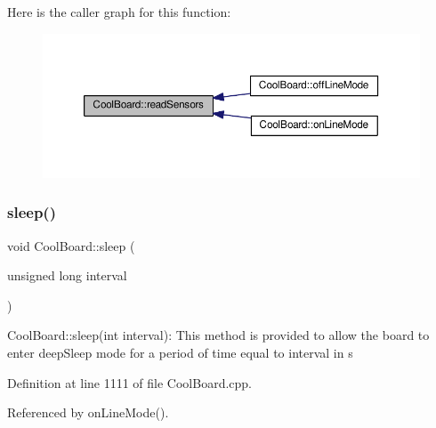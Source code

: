 Here is the caller graph for this function\+:
\nopagebreak
\begin{figure}[H]
\begin{center}
\leavevmode
\includegraphics[width=350pt]{classCoolBoard_ad03abdce2e65f520bbf2cff0f2d083cf_icgraph}
\end{center}
\end{figure}
\mbox{\label{classCoolBoard_a069952cdcb2e7f68518aa429eceadb6e}} 
\subsubsection{\texorpdfstring{sleep()}{sleep()}}
{\footnotesize\ttfamily void Cool\+Board\+::sleep (\begin{DoxyParamCaption}\item[{unsigned long}]{interval }\end{DoxyParamCaption})}

Cool\+Board\+::sleep(int interval)\+: This method is provided to allow the board to enter deep\+Sleep mode for a period of time equal to interval in s 

Definition at line 1111 of file Cool\+Board.\+cpp.



Referenced by on\+Line\+Mode().


